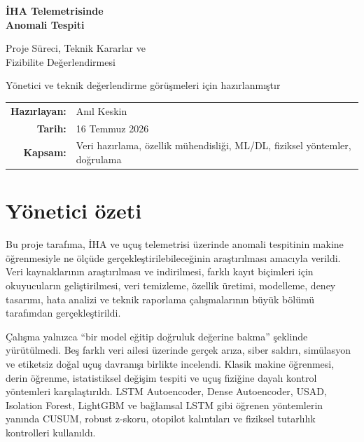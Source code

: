 \documentclass[11pt,a4paper]{article}
\begin{document}
\begin{titlepage}
  \centering
  \vspace*{2.4cm}
  {\Huge\bfseries\color{navy}
  İHA Telemetrisinde\\[5pt]
  Anomali Tespiti\par}
  \vspace{0.7cm}
  {\LARGE Proje Süreci, Teknik Kararlar ve\\
  Fizibilite Değerlendirmesi\par}
  \vspace{1.3cm}
  {\large Yönetici ve teknik değerlendirme görüşmeleri için hazırlanmıştır\par}
  \vfill

  \begin{tabular}{rl}
    \textbf{Hazırlayan:} & Anıl Keskin \\
    \textbf{Tarih:} & 16 Temmuz 2026 \\
    \textbf{Kapsam:} & Veri hazırlama, özellik mühendisliği, ML/DL, fiziksel yöntemler, doğrulama \\
  \end{tabular}

  \vfill
  \vspace*{1.4cm}
\end{titlepage}

\tableofcontents
\newpage

\section{Yönetici özeti}

Bu proje tarafıma, İHA ve uçuş telemetrisi üzerinde anomali tespitinin makine
öğrenmesiyle ne ölçüde gerçekleştirilebileceğinin araştırılması amacıyla verildi.
Veri kaynaklarının araştırılması ve indirilmesi, farklı kayıt biçimleri için
okuyucuların geliştirilmesi, veri temizleme, özellik üretimi, modelleme, deney
tasarımı, hata analizi ve teknik raporlama çalışmalarının büyük bölümü tarafımdan
gerçekleştirildi.

Çalışma yalnızca ``bir model eğitip doğruluk değerine bakma'' şeklinde
yürütülmedi. Beş farklı veri ailesi üzerinde gerçek arıza, siber saldırı, simülasyon
ve etiketsiz doğal uçuş davranışı birlikte incelendi. Klasik makine öğrenmesi,
derin öğrenme, istatistiksel değişim tespiti ve uçuş fiziğine dayalı kontrol
yöntemleri karşılaştırıldı. LSTM Autoencoder, Dense Autoencoder, USAD, Isolation
Forest, LightGBM ve bağlamsal LSTM gibi öğrenen yöntemlerin yanında CUSUM,
robust z-skoru, otopilot kalıntıları ve fiziksel tutarlılık kontrolleri kullanıldı.
\end{document}

